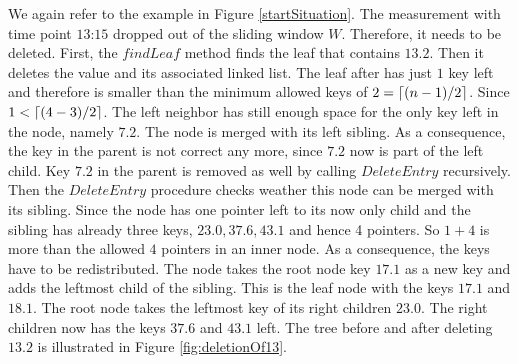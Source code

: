 \documentclass[abstracton,12pt,oneside]{scrreprt}
\DeclarePairedDelimiter\ceil{\lceil}{\rceil}
\begin{document}
\begin{exmp}
	We again refer to the example in Figure \ref{startSituation}. The measurement with time point $\text{13:15}$ dropped out of the sliding window $W$. Therefore, it needs to be deleted. First, the $findLeaf$ method finds the leaf that contains $13.2$. Then it deletes the value and its associated linked list. The leaf after has just $1$ key left and therefore is smaller than the minimum allowed keys of $2=\ceil{(n-1)/2}$. Since $1<\ceil{(4-3)/2}$. The left neighbor has still enough space for the only key left in the node, namely $7.2$. The node is merged with its left sibling. As a consequence, the key in the parent is not correct any more, since $7.2$ now is part of the left child. Key $7.2$ in the parent is removed as well by calling $DeleteEntry$ recursively. Then the $DeleteEntry$ procedure checks weather this node can be merged with its sibling. Since the node has one pointer left to its now only child and the sibling has already three keys, $23.0,37.6, 43.1$ and hence 4 pointers. So $1+4$ is more than the allowed $4$ pointers in an inner node. As a consequence, the keys have to be redistributed. The node takes the root node key $17.1$ as a new key and adds the leftmost child of the sibling. This is the leaf node with the keys $17.1$ and $18.1$. The root node takes the leftmost key of its right children $23.0$. The right children now has the keys $37.6$ and $43.1$ left. The tree before and after deleting $13.2$ is illustrated in Figure \ref{fig:deletionOf13}.
\end{exmp}
\end{document}
